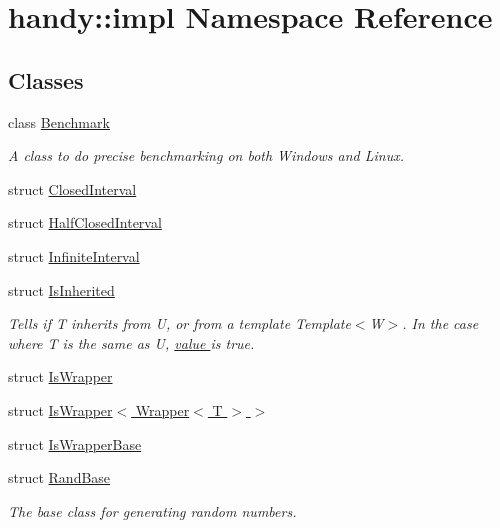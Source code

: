 \hypertarget{namespacehandy_1_1impl}{}\section{handy\+:\+:impl Namespace Reference}
\label{namespacehandy_1_1impl}
\subsection*{Classes}
\begin{DoxyCompactItemize}
\item 
class \hyperlink{classhandy_1_1impl_1_1Benchmark}{Benchmark}
\begin{DoxyCompactList}\small\item\em A class to do precise benchmarking on both Windows and Linux. \end{DoxyCompactList}\item 
struct \hyperlink{structhandy_1_1impl_1_1ClosedInterval}{Closed\+Interval}
\item 
struct \hyperlink{structhandy_1_1impl_1_1HalfClosedInterval}{Half\+Closed\+Interval}
\item 
struct \hyperlink{structhandy_1_1impl_1_1InfiniteInterval}{Infinite\+Interval}
\item 
struct \hyperlink{structhandy_1_1impl_1_1IsInherited}{Is\+Inherited}
\begin{DoxyCompactList}\small\item\em Tells if {\ttfamily T} inherits from {\ttfamily U}, or from a template {\ttfamily Template$<$\+W$>$}. In the case where {\ttfamily T} is the same as {\ttfamily U}, \hyperlink{structhandy_1_1impl_1_1IsInherited_ade331c690ccfcc4c9fbe160b83f9491ba3347f5ab27dd0282a949005f868dcde7}{value } is {\ttfamily true}. \end{DoxyCompactList}\item 
struct \hyperlink{structhandy_1_1impl_1_1IsWrapper}{Is\+Wrapper}
\item 
struct \hyperlink{structhandy_1_1impl_1_1IsWrapper_3_01Wrapper_3_01T_01_4_01_4}{Is\+Wrapper$<$ Wrapper$<$ T $>$ $>$}
\item 
struct \hyperlink{structhandy_1_1impl_1_1IsWrapperBase}{Is\+Wrapper\+Base}
\item 
struct \hyperlink{structhandy_1_1impl_1_1RandBase}{Rand\+Base}
\begin{DoxyCompactList}\small\item\em The base class for generating random numbers. \end{DoxyCompactList}\item 

\end{DoxyCompactItemize}
